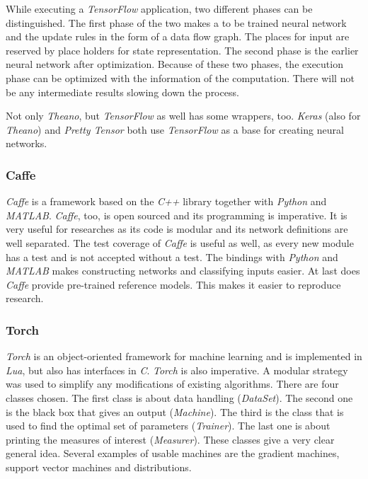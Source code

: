 \documentclass[10pt,a4paper]{report}
\begin{document}
	While executing a \textit{TensorFlow} application, two different phases can be 
	distinguished. The first phase of the two makes a to be trained neural 
	network and the update rules in the form of a data flow graph. The places 
	for input are reserved by place holders for state representation. The 
	second phase is the earlier neural network after optimization. Because of 
	these two phases, the execution phase can be optimized with the information 
	of the computation. There will not be any intermediate results slowing down 
	the process.  \cite{abadi2016tensorflow}
	
	Not only \textit{Theano}, but \textit{TensorFlow} as well has some wrappers, too. \textit{Keras} (also 
	for \textit{Theano}) and \textit{Pretty Tensor} both use \textit{TensorFlow} as a base for creating 
	neural networks.  \cite{rampasek2016tensorflow}
	
	\subsubsection{Caffe}
	
	\textit{Caffe} is a framework based on the \textit{C++} library together with \textit{Python} and 
	\textit{MATLAB}. \textit{Caffe}, too, is open sourced and its programming is imperative. 
	 \cite{rampasek2016tensorflow} It is very useful for researches as 
	its code is modular and its network definitions are well separated. The 
	test coverage of \textit{Caffe} is useful as well, as every new module has a test 
	and is not accepted without a test. The bindings with \textit{Python} and \textit{MATLAB }
	makes constructing networks and classifying inputs easier. At last does 
	\textit{Caffe} provide pre-trained reference models. This makes it easier to 
	reproduce research.
	 \cite{DBLP:journals/corr/JiaSDKLGGD14}
	
	\subsubsection{Torch}
	
	\textit{Torch} is an object-oriented framework for machine learning and is 
	implemented in \textit{Lua}, but also has interfaces in \textit{C}. \textit{Torch} is also 
	imperative. \cite{rampasek2016tensorflow} A modular strategy was used to 
	simplify any 
	modifications of existing algorithms. There are four classes chosen. The 
	first class is about data handling (\textit{DataSet}). The second one is the black 
	box that gives an output (\textit{Machine}). The third is the class that is used to 
	find the optimal set of parameters (\textit{Trainer}). The last one is about 
	printing the measures of interest (\textit{Measurer}). These classes give a very 
	clear general idea. Several examples of usable machines are the gradient 
	machines, support vector machines and distributions. 
	 \cite{collobert2002torch}
	
\end{document}
